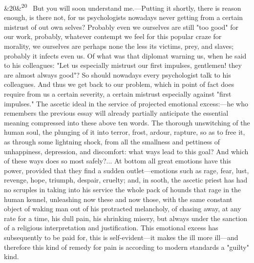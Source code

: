 \documentclass[12pt]{article}
\newcommand{\para}[1][]{\par\noindent\ifx&#1&\else\textsuperscript{\footnotesize #1}~\fi}
\begin{document}
\para[20] But you will soon understand me.---Putting it shortly, there is reason enough, is there not, for us psychologists nowadays never getting from a certain mistrust of out own selves? Probably even we ourselves are still "too good" for our work, probably, whatever contempt we feel for this popular craze for morality, we ourselves are perhaps none the less its victims, prey, and slaves; probably it infects even us. Of what was that diplomat warning us, when he said to his colleagues: "Let us especially mistrust our first impulses, gentlemen! they are almost always good"? So should nowadays every psychologist talk to his colleagues. And thus we get back to our problem, which in point of fact does require from us a certain severity, a certain mistrust especially against "first impulses." The ascetic ideal in the service of projected emotional excess:---he who remembers the previous essay will already partially anticipate the essential meaning compressed into these above ten words. The thorough unswitching of the human soul, the plunging of it into terror, frost, ardour, rapture, so as to free it, as through some lightning shock, from all the smallness and pettiness of unhappiness, depression, and discomfort: what ways lead to this goal? And which of these ways does so most safely?... At bottom all great emotions have this power, provided that they find a sudden outlet---emotions such as rage, fear, lust, revenge, hope, triumph, despair, cruelty; and, in sooth, the ascetic priest has had no scruples in taking into his service the whole pack of hounds that rage in the human kennel, unleashing now these and now those, with the same constant object of waking man out of his protracted melancholy, of chasing away, at any rate for a time, his dull pain, his shrinking misery, but always under the sanction of a religious interpretation and justification. This emotional excess has subsequently to be paid for, this is self-evident---it makes the ill more ill---and therefore this kind of remedy for pain is according to modern standards a "guilty" kind.
\end{document}
